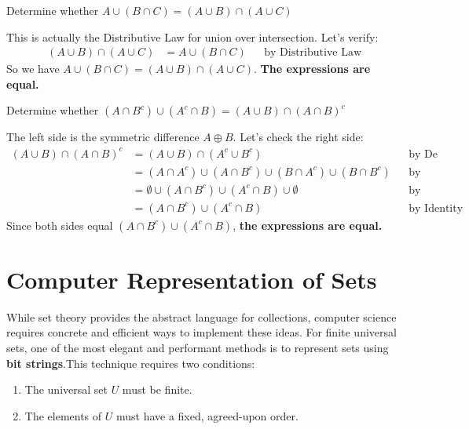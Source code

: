 \begin{example}{Determine whether $A \cup (B \cap C) = (A \cup B) \cap (A \cup C)$}
\begin{solution}
This is actually the Distributive Law for union over intersection. Let's verify:
\begin{align*}
    (A \cup B) \cap (A \cup C) &= A \cup (B \cap C) && \text{by Distributive Law}
\end{align*}
So we have $A \cup (B \cap C) = (A \cup B) \cap (A \cup C)$. \textbf{The expressions are equal.}
\end{solution}
\end{example}

\begin{example}{Determine whether $(A \cap B^c) \cup (A^c \cap B) = (A \cup B) \cap (A \cap B)^c$}
\begin{solution}
The left side is the symmetric difference $A \oplus B$. Let's check the right side:
\begin{align*}
    (A \cup B) \cap (A \cap B)^c &= (A \cup B) \cap (A^c \cup B^c) && \text{by De Morgan's Law} \\
    &= (A \cap A^c) \cup (A \cap B^c) \cup (B \cap A^c) \cup (B \cap B^c) && \text{by Distributive Law} \\
    &= \emptyset \cup (A \cap B^c) \cup (A^c \cap B) \cup \emptyset && \text{by Complement Law} \\
    &= (A \cap B^c) \cup (A^c \cap B) && \text{by Identity Law}
\end{align*}
Since both sides equal $(A \cap B^c) \cup (A^c \cap B)$, \textbf{the expressions are equal.}
\end{solution}
\end{example}



\section{Computer Representation of Sets}
While set theory provides the abstract language for collections, computer science requires concrete and efficient ways to implement these ideas. For finite universal sets, one of the most elegant and performant methods is to represent sets using \textbf{bit strings}.This technique requires two conditions:
\begin{enumerate}
    \item The universal set $U$ must be finite.
    \item The elements of $U$ must have a fixed, agreed-upon order.
\end{enumerate}

